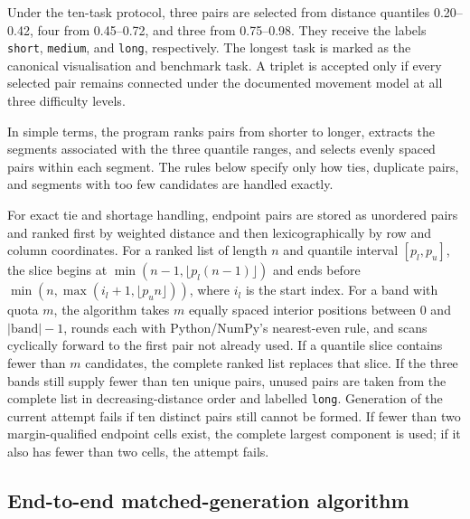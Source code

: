 \documentclass[11pt]{article}
\begin{document}
Under the ten-task protocol, three pairs are selected from distance quantiles
0.20--0.42, four from 0.45--0.72, and three from 0.75--0.98. They receive the
labels \texttt{short}, \texttt{medium}, and \texttt{long}, respectively. The
longest task is marked as the canonical visualisation and benchmark task. A
triplet is accepted only if every selected pair remains connected under the
documented movement model at all three difficulty levels.

In simple terms, the program ranks pairs from shorter to longer, extracts the
segments associated with the three quantile ranges, and selects evenly spaced
pairs within each segment. The rules below specify only how ties, duplicate
pairs, and segments with too few candidates are handled exactly.

For exact tie and shortage handling, endpoint pairs are stored as unordered
pairs and ranked first by weighted distance and then lexicographically by row
and column coordinates. For a ranked list of length $n$ and quantile interval
$[p_l,p_u]$, the slice begins at
$\min(n-1,\lfloor p_l(n-1)\rfloor)$ and ends before
$\min(n,\max(i_l+1,\lfloor p_u n\rfloor))$, where $i_l$ is the start index.
For a band with quota $m$, the algorithm takes $m$ equally spaced interior
positions between 0 and $|\mathrm{band}|-1$, rounds each with Python/NumPy's
nearest-even rule, and scans cyclically forward to the first pair not already used.
If a quantile slice contains fewer than $m$ candidates, the complete ranked
list replaces that slice. If the three bands still supply fewer than ten unique
pairs, unused pairs are taken from the complete list in decreasing-distance
order and labelled \texttt{long}. Generation of the current attempt fails if
ten distinct pairs still cannot be formed. If fewer than two margin-qualified
endpoint cells exist, the complete largest component is used; if it also has
fewer than two cells, the attempt fails.

\subsection{End-to-end matched-generation algorithm}
\end{document}
